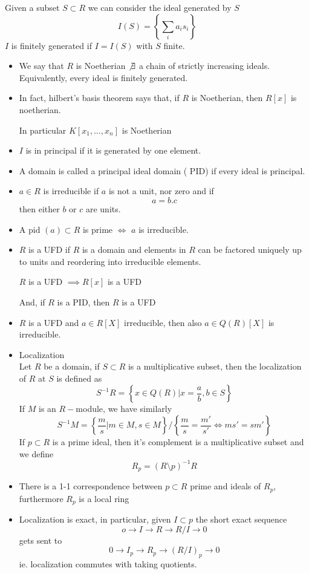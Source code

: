 \documentclass[../main.tex]{subfiles}
\begin{document}
Given a subset $S \subset R$ we can consider the ideal generated by $S$ 
\[ 
I( S) = \left\{ \sum_i a_i s_i \right\} 
\]
$I$ is finitely generated if $I=I( S) $ with $S$ finite.
\begin{itemize}
\item We say that $R$ is Noetherian $\not\exists$ a chain of strictly increasing ideals.
	Equivalently, every ideal is finitely generated.
\item 
	\begin{thm}
		In fact, hilbert's  basis theorem says that, if $R$ is Noetherian, then $R[x]$ is noetherian.
	\end{thm}
	
	In particular $K[x_1,\ldots,x_n]$ is Noetherian
\item $I$ is in principal if it is generated by one element.
\item A domain is called a principal ideal domain ( PID) if every ideal is principal.

\item $a\in R$ is irreducible if $a$ is not a unit, nor zero and if
	\[ 
	a=b.c
	\]
then either $b$ or $c$ are units.
\item A pid $ ( a) \subset R$ is prime $\iff$ $a$ is irreducible.
\item $R$ is a UFD if $R$ is a domain and elements in $R$ can be factored uniquely up to units and reordering into irreducible elements.
	\begin{thm}
		$R$ is a UFD $\implies R[x]$ is a UFD	
	\end{thm}
	And, if $R$ is a PID, then $R$ is a UFD
\item 
	\begin{thm}
		$R$ is a UFD and $a\in R[X]$ irreducible, then also $a\in Q( R) [ X] $ is irreducible.
	\end{thm}

\item Localization\\
	Let $R$ be a domain, if $S \subset R$ is a multiplicative subset, then the localization of $R$ at $S$ is defined as
	\[ 
	S^{-1}R= \left\{ x\in Q( R) | x= \frac{a}{b},b\in S \right\} 
	\]
	If $M$ is an $R-$module, we have similarly
	\[ 
	S^{-1}M= \left\{ \frac{m}{s} | m\in M,s\in M \right\} / \left\{ \frac{m}{s}= \frac{m'}{s'}\iff ms'=sm' \right\} 
	\]
	If $ p\subset R$ is a prime ideal, then it's complement is a multiplicative subset and we define
	\[ 
	R_{p} = ( R\setminus p)^{-1}R
	\]

\item There is a 1-1 correspondence between $p \subset R$ prime and ideals of $R_p$, furthermore $R_p$ is a local ring

\item Localization is exact, in particular, given $I \subset p$ the short exact sequence
	\[ 
	o\to I \to R \to R /I \to 0
	\]
	gets sent to 
	\[ 
	0\to I_p\to R_p \to ( R /I)_p\to 0
	\]
	ie. localization commutes with taking quotients.
	
\end{itemize}
\end{document}
